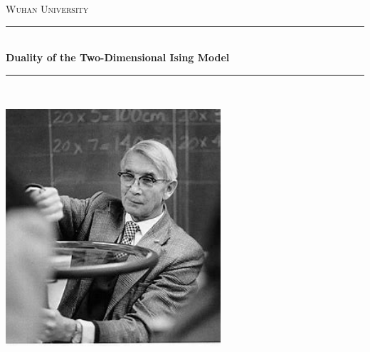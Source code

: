 \begin{titlepage}

\newcommand{\HRule}{\rule{\linewidth}{0.5mm}} %
\center %
 

\textsc{\LARGE Wuhan University}\\[1.5cm] %



\HRule \\[0.4cm]
{ \LARGE \bfseries Duality of the Two-Dimensional Ising Model }\\[0.4cm] %
\HRule \\[1.5cm]
 

\begin{minipage}{0.4\textwidth}
\end{minipage}


\vfill %
\includegraphics[width=0.6\textwidth]{figures/伊辛}\\[1cm]
\end{titlepage}


